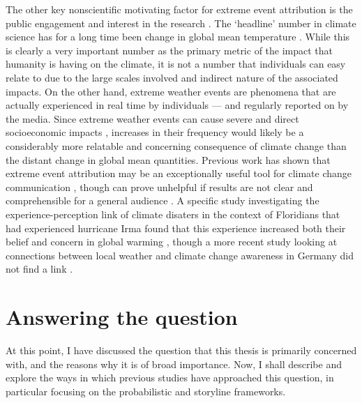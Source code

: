   The other key nonscientific motivating factor for extreme event attribution is the public engagement and interest in the research  \citep{swain_attributing_2020}. The `headline' number in climate science has for a long time been change in global mean temperature \citep{stocker_climate_2013,ipcc_global_2018,masson-delmotte_climate_2021}. While this is clearly a very important number as the primary metric of the impact that humanity is having on the climate, it is not a number that individuals can easy relate to due to the large scales involved and indirect nature of the associated impacts. On the other hand, extreme weather events are phenomena that are actually experienced in real time by individuals --- and regularly reported on by the media. Since extreme weather events can cause severe and direct socioeconomic impacts \citep{fouillet_excess_2006}, increases in their frequency would likely be a considerably more relatable and concerning consequence of climate change than the distant change in global mean quantities. Previous work has shown that extreme event attribution may be an exceptionally useful tool for climate change communication \citep{ettinger_whats_2021}, though can prove unhelpful if results are not clear and comprehensible for a general audience \citep[for example if different attribution studies regarding a single event appear to provide conflicting headline results][]{osaka_natural_2020}. A specific study investigating the experience-perception link of climate disaters in the context of Floridians that had experienced hurricane Irma found that this experience increased both their belief and concern in global warming \citep{bergquist_experiencing_2019}, though a more recent study looking at connections between local weather and climate change awareness in Germany did not find a link \citep{gartner_experiencing_2021}.

  \citep{sillmann_understanding_2017}

\section{Answering the question}

  At this point, I have discussed the question that this thesis is primarily concerned with, and the reasons why it is of broad importance. Now, I shall describe and explore the ways in which previous studies have approached this question, in particular focusing on the probabilistic \citep[often ``conventional'',][]{stott_human_2004} and storyline \citep{hoerling_anatomy_2013} frameworks. 

